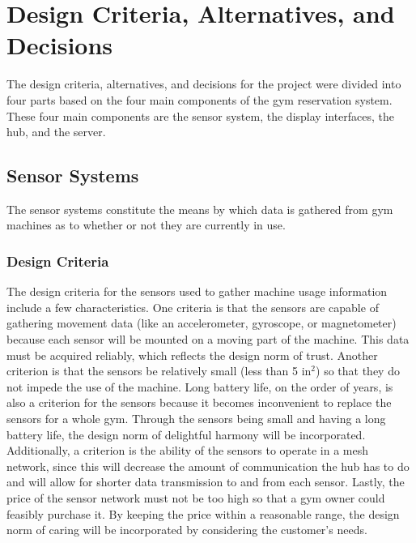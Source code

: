 \documentclass[PPFS.tex]{template/subfiles}
\begin{document}
\section{Design Criteria, Alternatives, and Decisions}

The design criteria, alternatives, and decisions for the project were divided into four parts based on the four main components of the gym reservation system. These four main components are the sensor system, the display interfaces, the hub, and the server.

\subsection{Sensor Systems}

The sensor systems constitute the means by which data is gathered from gym machines as to whether or not they are currently in use.

\subsubsection{Design Criteria}

The design criteria for the sensors used to gather machine usage information include a few characteristics. One criteria is that the sensors are capable of gathering movement data (like an accelerometer, gyroscope, or magnetometer) because each sensor will be mounted on a moving part of the machine. This data must be acquired reliably, which reflects the design norm of trust. Another criterion is that the sensors be relatively small (less than 5 in$^2$) so that they do not impede the use of the machine. Long battery life, on the order of years, is also a criterion for the sensors because it becomes inconvenient to replace the sensors for a whole gym. Through the sensors being small and having a long battery life, the design norm of delightful harmony will be incorporated. Additionally, a criterion is the ability of the sensors to operate in a mesh network, since this will decrease the amount of communication the hub has to do and will allow for shorter data transmission to and from each sensor. Lastly, the price of the sensor network must not be too high so that a gym owner could feasibly purchase it. By keeping the price within a reasonable range, the design norm of caring will be incorporated by considering the customer's needs.
\end{document}
